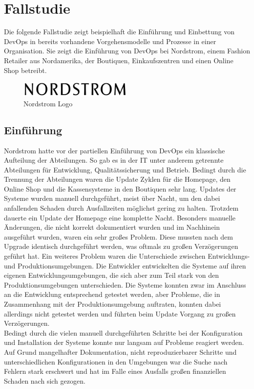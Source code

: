 \newpage
\section{Fallstudie} %
Die folgende Fallstudie zeigt beispielhaft die Einführung und Einbettung von DevOps in bereits vorhandene Vorgehensmodelle und Prozesse in einer Organisation. Sie zeigt die Einführung von DevOps bei Nordstrom, einem Fashion Retailer aus Nordamerika, der Boutiquen, Einkaufszentren und einen Online Shop betreibt.

\begin{figure}[ht]
  \centering
  \includegraphics[width=0.5\textwidth]{img/nordstrom_logo.png}
  \caption{Nordstrom Logo \parencite[][]{Nordstrom:2016}}
  \label{fig:scrummodell}
\end{figure}

\subsection{Einführung}
Nordstrom hatte vor der partiellen Einführung von DevOps ein klassische Aufteilung der Abteilungen. So gab es in der IT unter anderem getrennte Abteilungen für Entwicklung, Qualitätssicherung und Betrieb. \parencite[Vgl.][S. 1]{Reed:2014} Bedingt durch die Trennung der Abteilungen waren die Update Zyklen für die Homepage, den Online Shop und die Kassensysteme in den Boutiquen sehr lang. Updates der Systeme wurden manuell durchgeführt, meist über Nacht, um den dabei anfallenden Schaden durch Ausfallzeiten möglichst gering zu halten. Trotzdem dauerte ein Update der Homepage eine komplette Nacht. Besonders manuelle Änderungen, die nicht korrekt dokumentiert wurden und im Nachhinein ausgeführt wurden, waren ein sehr großes Problem. Diese mussten nach dem Upgrade identisch durchgeführt werden, was oftmals zu großen Verzögerungen geführt hat. Ein weiteres Problem waren die Unterschiede zwischen Entwicklungs- und Produktionsumgebungen. Die Entwickler entwickelten die Systeme auf ihren eigenen Entwicklungsumgebungen, die sich aber zum Teil stark von den Produktionsumgebungen unterschieden. Die Systeme konnten zwar im Anschluss an die Entwicklung entsprechend getestet werden, aber Probleme, die in Zusammenhang mit der Produktionsumgebung auftraten, konnten dabei allerdings nicht getestet werden und führten beim Update Vorgang zu großen Verzögerungen.\\
Bedingt durch die vielen manuell durchgeführten Schritte bei der Konfiguration und Installation der Systeme konnte nur langsam auf Probleme reagiert werden. Auf Grund mangelhafter Dokumentation, nicht reproduzierbarer Schritte und unterschiedlichen Konfigurationen in den Umgebungen war die Suche nach Fehlern stark erschwert und hat im Falle eines Ausfalls großen finanziellen Schaden nach sich gezogen. \parencite[Vgl.][S. 3]{Reed:2014}

